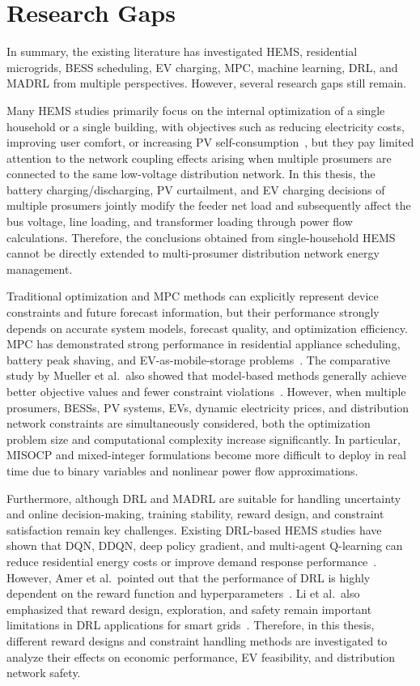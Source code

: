 \section{Research Gaps}

In summary, the existing literature has investigated HEMS, residential microgrids, BESS scheduling, EV charging, MPC, machine learning, DRL, and MADRL from multiple perspectives. However, several research gaps still remain.

Many HEMS studies primarily focus on the internal optimization of a single household or a single building, with objectives such as reducing electricity costs, improving user comfort, or increasing PV self-consumption~\parencite{ZHOU201630,BEAUDIN2015318,JIN20171583}, but they pay limited attention to the network coupling effects arising when multiple prosumers are connected to the same low-voltage distribution network. In this thesis, the battery charging/discharging, PV curtailment, and EV charging decisions of multiple prosumers jointly modify the feeder net load and subsequently affect the bus voltage, line loading, and transformer loading through power flow calculations. Therefore, the conclusions obtained from single-household HEMS cannot be directly extended to multi-prosumer distribution network energy management.

Traditional optimization and MPC methods can explicitly represent device constraints and future forecast information, but their performance strongly depends on accurate system models, forecast quality, and optimization efficiency. MPC has demonstrated strong performance in residential appliance scheduling, battery peak shaving, and EV-as-mobile-storage problems~\parencite{Chen20131401,DONGOL20181,10012434}. The comparative study by Mueller et al.\ also showed that model-based methods generally achieve better objective values and fewer constraint violations~\parencite{MUELLER2025126465}. However, when multiple prosumers, BESSs, PV systems, EVs, dynamic electricity prices, and distribution network constraints are simultaneously considered, both the optimization problem size and computational complexity increase significantly. In particular, MISOCP and mixed-integer formulations become more difficult to deploy in real time due to binary variables and nonlinear power flow approximations.

Furthermore, although DRL and MADRL are suitable for handling uncertainty and online decision-making, training stability, reward design, and constraint satisfaction remain key challenges. Existing DRL-based HEMS studies have shown that DQN, DDQN, deep policy gradient, and multi-agent Q-learning can reduce residential energy costs or improve demand response performance~\parencite{Liu2020572,MOCANU20193698,8981876}. However, Amer et al.\ pointed out that the performance of DRL is highly dependent on the reward function and hyperparameters~\parencite{en15218235}. Li et al.\ also emphasized that reward design, exploration, and safety remain important limitations in DRL applications for smart grids~\parencite{10241311}. Therefore, in this thesis, different reward designs and constraint handling methods are investigated to analyze their effects on economic performance, EV feasibility, and distribution network safety. 

